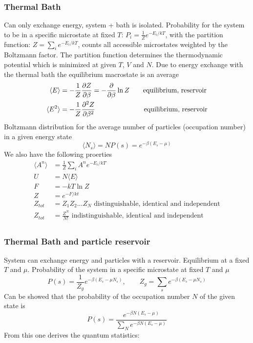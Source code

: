 \documentclass[a4paper, norsk, 8pt]{article}
\begin{document}
\begin{multicols*}{3}
\subsubsection*{\scriptsize Thermal Bath}
Can only exchange energy, system + bath is isolated. Probability for the system to be in a specific microstate at fixed $T$: $P_i = \frac{1}{Z}e^{-E_i/kT}$, with the partition function: $Z = \sum_{i} e^{-E_i/kT}$, counts all accessible microstates weighted by the Boltzmann factor. The partition function determines the thermodynamic potential which is minimized at given $T$, $V$ and $N$. Due to energy exchange with the thermal bath the equilibrium macrostate is an average
\begin{align*}
  \langle E \rangle &= -\frac{1}{Z}\pdv{Z}{\beta}  = -\pdv{}{\beta}\ln{Z}\qquad \text{equilibrium, reservoir}\\
  \langle E^2 \rangle &= -\frac{1}{Z}\pdv[2]{Z}{\beta}\quad \qquad \qquad \qquad \,\text{equilibrium, reservoir}
\end{align*}
Boltzmann distribution for the average number of particles (occupation number) in a given energy state
\begin{equation}
  \langle N_s \rangle = NP(s) = e^{-\beta(E_s-\mu)}
\end{equation}
We also have the following proerties
\begin{align*}
    \langle A^n \rangle &= \frac{1}{Z}\sum_{i} A^n e^{-E_i/kT} \\
    U &= N\langle E \rangle  \\
    F &= -kT\ln{Z} \\
    Z &= e^{-F/kt} \\
    Z_{tot} &= Z_1Z_2...Z_N\,\, \text{distinguishable, identical and independent}\\
    Z_{tot} &= \frac{Z^N}{N!}\,\, \text{indistinguishable, identical and independent }\\
\end{align*}
\subsubsection*{\scriptsize Thermal Bath and particle reservoir}
System can exchange energy and particles with a reservoir. Equilibrium at a fixed $T$ and $\mu$. Probability of the system in a specific microstate at fixed $T$ and $\mu$
\begin{equation*}
  P(s) = \frac{1}{Z_g}e^{-\beta \left( E_s-\mu N_s \right)}, \qquad Z_g = \sum_s e^{-\beta \left(E_s-\mu N_s \right) }
\end{equation*}
Can be showed that the probability of the occupation number $N$ of the given state is
\begin{equation*}
  P(s) = \frac{e^{-\beta N \left( E_s-\mu  \right)}}{\sum_{N} e^{-\beta N \left( E_s-\mu  \right)}}
\end{equation*}
From this one derives the quantum statistics:

\end{multicols*}
\end{document}
